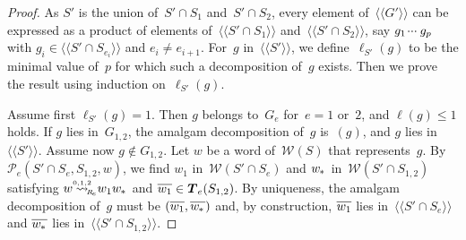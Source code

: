 \documentclass{amsart}
\numberwithin{equation}{section}
\theoremstyle{plain}
\theoremstyle{definition}
\let\le=\leqslant
\begin{document}
\begin{proof}
As ${S}'$ is the union of~${S}' \cap {S}_1$ and~${S}' \cap {S}_2$, every element of~${\langle\!\langle{{{G}'}}\rangle\!\rangle}$ can be expressed as a product of elements of~${\langle\!\langle{{{S}' \cap {S}_1}}\rangle\!\rangle}$ and~${\langle\!\langle{{{S}' \cap {S}_2}}\rangle\!\rangle}$, say ${g}_1 {\hspace{0.2ex}{\cdot}{\cdot}{\cdot}\hspace{0.5ex}} {g}_{p}$ with ${g}_{i} \in {\langle\!\langle{{{S}' \cap {S}_{{e}_{i}}}}\rangle\!\rangle}$ and ${e}_{i} \not= {e}_{{i}+1}$. For~${g}$ in~${\langle\!\langle{{{S}'}}\rangle\!\rangle}$, we define~${\ell_{{{S}'}}({g})}$ to be the minimal value of~${p}$ for which such a decomposition of~${g}$ exists. Then we prove the result using induction on~${\ell_{{{S}'}}({g})}$.

Assume first ${\ell_{{{S}'}}({g})} = 1$. Then ${g}$ belongs to~${G}_{e}$ for~${e} = 1$ or~$2$, and ${\ell({g})} \le 1$ holds. If ${g}$ lies in~${G}_{1,2}$, the amalgam decomposition of~${g}$ is~$({g})$, and ${g}$ lies in~${\langle\!\langle{{{S}'}}\rangle\!\rangle}$. Assume now ${g} \notin {G}_{1,2}$. Let ${w}$ be a word of~${\mathcal{W}({S})}$ that represents~${g}$. By ${\mathcal{P}_{\!e}({{S}' \cap {S}_{e}}, {{S}_{1,2}}, {w})}$, we find ${w}_1$ in~${\mathcal{W}({{S}' \cap {S}_{e}})}$ and ${{w}_{\hspace{-0.1ex}*\hspace{0.2ex}}}$ in~${\mathcal{W}({{S}' \cap {S}_{1,2}})}$ satisfying ${w} {\mathrel{{\mathrel{\overset{\scriptscriptstyle 0,1,2}{\rightsquigarrow}}}_{\hspace{-0.9ex}{\scriptscriptstyle R}_{\hspace{-0.2ex}e}}}} {w}_1 {{w}_{\hspace{-0.1ex}*\hspace{0.2ex}}}$ and ${\overline{\vrule width0pt height5pt{{w}_1}}} \in {\boldsymbol{T}}_{e}({S}_{1,2})$. By uniqueness, the amalgam decomposition of~${g}$ must be $({\overline{\vrule width0pt height5pt{{w}_1}}}, {\overline{\vrule width0pt height5pt{{w}_{\hspace{-0.1ex}*\hspace{0.2ex}}}}})$ and, by construction, ${\overline{\vrule width0pt height5pt{{w}_1}}}$ lies in~${\langle\!\langle{{{S}' \cap {S}_{e}}}\rangle\!\rangle}$ and ${\overline{\vrule width0pt height5pt{{w}_{\hspace{-0.1ex}*\hspace{0.2ex}}}}}$ lies in~${\langle\!\langle{{{S}' \cap {S}_{1,2}}}\rangle\!\rangle}$.


\end{proof}
\end{document}

